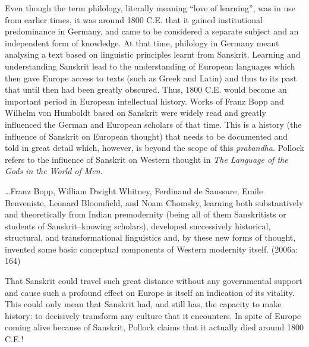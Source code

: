 Even though the term philology, literally meaning “love of learning”, was in use from earlier times, it was around 1800 C.E. that it gained institutional predominance in Germany, and came to be considered a separate subject and an independent form of knowledge. At that time, philology in Germany meant analysing a text based on linguistic principles learnt from Sanskrit. Learning and understanding Sanskrit lead to the understanding of European languages which then gave Europe access to texts (such as Greek and Latin) and thus to its past that until then had been greatly obscured. Thus, 1800 C.E. would become an important period in European intellectual history. Works of Franz Bopp and Wilhelm von Humboldt based on Sanskrit were widely read and greatly influenced the German and European scholars of that time. This is a history (the influence of Sanskrit on European thought) that needs to be documented and told in great detail which, however, is beyond the scope of this \textit{prabandha}. Pollock refers to the influence of Sanskrit on Western thought in \textit{The Language of the Gods in the World of Men}.

\begin{myquote}
…Franz Bopp, William Dwight Whitney, Ferdinand de Saussure, Emile Benveniste, Leonard Bloomﬁeld, and Noam Chomsky, learning both substantively and theoretically from Indian premodernity (being all of them Sanskritists or students of Sanskrit–knowing scholars), developed successively historical, structural, and transformational linguistics and, by these new forms of thought, invented some basic conceptual components of Western modernity itself. (2006a: 164)
\end{myquote}

That Sanskrit could travel such great distance without any governmental support and cause such a profound effect on Europe is itself an indication of its vitality. This could only mean that Sanskrit had, and still has, the capacity to make history: to decisively transform any culture that it encounters. In spite of Europe coming alive because of Sanskrit, Pollock claims that it actually died around 1800 C.E.!

